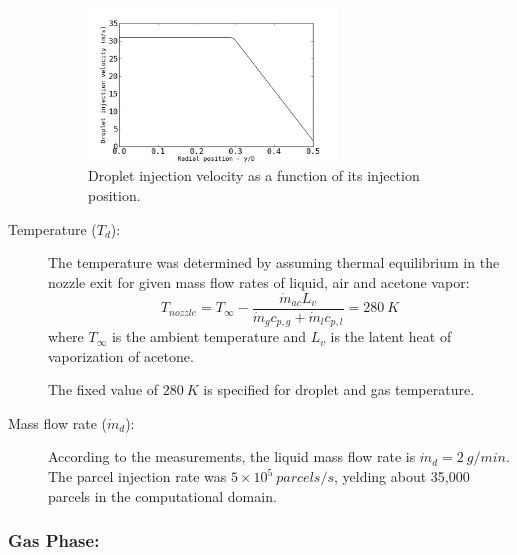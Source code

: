 \begin{description}
  \begin{figure}[h]
  \centering
  \includegraphics[width=0.65\textwidth]{./figuras/chap3/bc/bc_dropU.png}
  \caption{Droplet injection velocity as a function of its injection position.}
  \label{fig: bc_dropU}
  \end{figure} 
  
  \item[Temperature ($T_d$):] The temperature was determined by assuming thermal equilibrium in the nozzle exit for given mass flow rates of liquid, air and acetone vapor:
  \begin{equation}\label{eq: bc_est_T}
  T_{nozzle}=T_{\infty} - \frac{\dot{m}_{ac} L_{v}}{\dot{m}_g c_{p,g}+\dot{m}_l c_{p,l}} = 280\ K
  \end{equation}
  where $T_{\infty}$ is the ambient temperature and $L_v$ is the latent heat of vaporization of acetone.
  
  The fixed value of $280\ K$ is specified for droplet and gas temperature. 
  
  \item[Mass flow rate ($\dot{m}_d$):] According to the measurements, the liquid mass flow rate is $\dot{m}_d=2\ g/min$.  The parcel injection rate was $5\times10^5\ parcels/s$, yelding about 35,000 parcels in the computational domain.
  \end{description}
  
\subsubsection{Gas Phase:}
  
